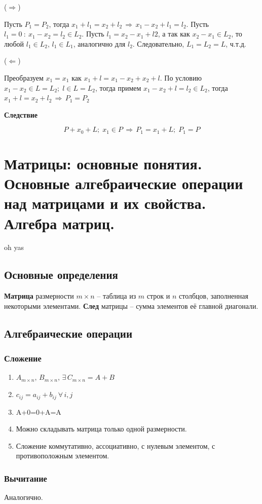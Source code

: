 \documentclass{article}
\begin{document}
($\Rightarrow$)

Пусть $P_1=P_2$, тогда $x_1+l_1=x_2+l_2\,\Rightarrow\,x_1-x_2+l_1=l_2$. Пусть $l_1=0\::\:x_1-x_2=l_2\in L_2$. Пусть $l_1=x_2-x_1+l2$, а так как $x_2-x_1\in L_2$, то любой $l_1\in L_2,\,l_1\in L_1$, аналогично для $l_2$. Следовательно, $L_1=L_2=L$, ч.т.д.

($\Leftarrow$)

Преобразуем $x_1=x_1$ как $x_1+l=x_1-x_2+x_2+l$. По условию $x_1-x_2\in L=L_2;\;l\in L= L_2$, тогда примем $x_1-x_2+l=l_2\in L_2$, тогда $x_1+l=x_2+l_2\,\Rightarrow\,P_1=P_2$

\textbf{Следствие}

$$ P+x_0+L;\;x_1\in P\,\Rightarrow\,P_1=x_1+L;\;P_1=P $$

\newpage
\section{Матрицы: основные понятия. Основные алгебраические операции над матрицами и их свойства. Алгебра матриц.}
oh yas

\subsection{Основные определения}
\textbf{Матрица} размерности $m \times n$ -- таблица из $m$ строк и $n$ столбцов, заполненная некоторыми элементами. \textbf{След} матрицы -- сумма элементов её главной диагонали.

\subsection{Алгебраические операции}
\subsubsection{Сложение}
\begin{enumerate}
    \item $A_{m\times n},\,B_{m\times n},\,\exists\, C_{m\times n}=A+B$
    \item $c_{ij}=a_{ij}+b_{ij}\:\forall\,i,j$
    \item A+0=0+A=A
    \item Можно складывать матрица только одной размерности.
    \item Сложение коммутативно, ассоциативно, с нулевым элементом, с противоположным элементом.
\end{enumerate}
\subsubsection{Вычитание}
Аналогично.
\end{document}
